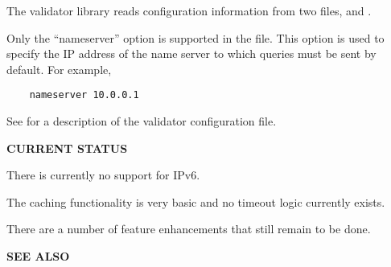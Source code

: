 The validator library reads configuration information from two files,
 and .

Only the ``nameserver'' option is supported in the  file.
This option is used to specify the IP address of the name server to which
queries must be sent by default.  For example,

\begin{verbatim}
    nameserver 10.0.0.1
\end{verbatim}

See  for a description of the validator configuration file.

{\bf CURRENT STATUS}

There is currently no support for IPv6.

The caching functionality is very basic and no timeout logic currently exists.

There are a number of feature enhancements that still remain to be done.

{\bf SEE ALSO}


